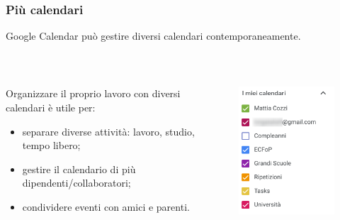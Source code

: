 \documentclass[handout]{beamer}
\begin{document}
\begin{frame}
\frametitle{Più calendari}
Google Calendar può gestire diversi calendari contemporaneamente.

~

\begin{columns}
  \begin{column}{.5\textwidth}
    Organizzare il proprio lavoro con diversi calendari è utile per:
\begin{itemize}
  \item separare diverse attività: lavoro, studio, tempo libero;\pause
  \item gestire il calendario di più dipendenti/collaboratori;\pause
  \item condividere eventi con amici e parenti.
\end{itemize}
  \end{column}
  \begin{column}{.4\textwidth}
    \begin{figure}
      \includegraphics[width=\columnwidth]{img/calendarcals.png}
    \end{figure}
  \end{column}
\end{columns}
\end{frame}
\end{document}
